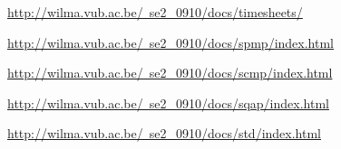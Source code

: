 \documentclass{article}
\begin{document}
\begin{thebibliography}{99}

	\href{http://wilma.vub.ac.be/~se2_0910/docs/timesheets/}{http://wilma.vub.ac.be/~se2_0910/docs/timesheets/}
	
	\href{http://wilma.vub.ac.be/~se2_0910/docs/spmp/index.html}{http://wilma.vub.ac.be/~se2_0910/docs/spmp/index.html}
	
	\href{http://wilma.vub.ac.be/~se2_0910/docs/scmp/index.html}{http://wilma.vub.ac.be/~se2_0910/docs/scmp/index.html}
	
	\href{http://wilma.vub.ac.be/~se2_0910/docs/sqap/index.html}{http://wilma.vub.ac.be/~se2_0910/docs/sqap/index.html}
	
	\href{http://wilma.vub.ac.be/~se2_0910/docs/std/index.html}{http://wilma.vub.ac.be/~se2_0910/docs/std/index.html}
	
\end{thebibliography}
\end{document}
